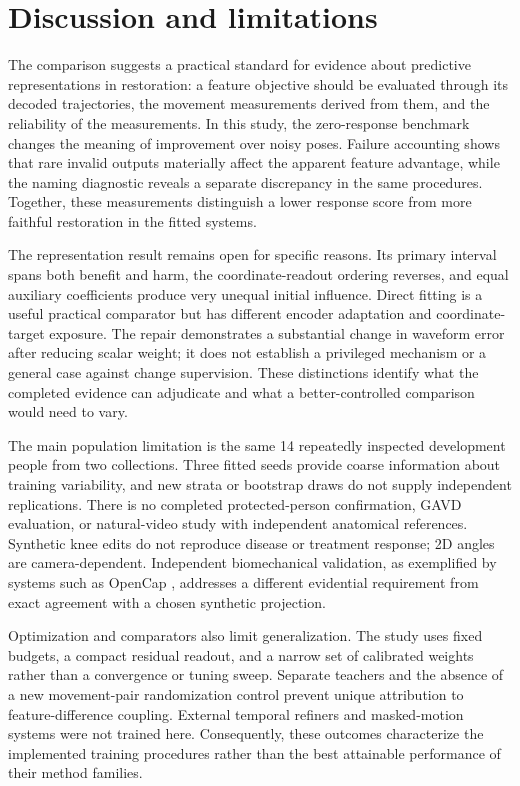 \documentclass{article}
\begin{document}
\section{Discussion and limitations}
The comparison suggests a practical standard for evidence about predictive representations in restoration: a feature objective should be evaluated through its decoded trajectories, the movement measurements derived from them, and the reliability of the measurements. In this study, the zero-response benchmark changes the meaning of improvement over noisy poses. Failure accounting shows that rare invalid outputs materially affect the apparent feature advantage, while the naming diagnostic reveals a separate discrepancy in the same procedures. Together, these measurements distinguish a lower response score from more faithful restoration in the fitted systems.

The representation result remains open for specific reasons. Its primary interval spans both benefit and harm, the coordinate-readout ordering reverses, and equal auxiliary coefficients produce very unequal initial influence. Direct fitting is a useful practical comparator but has different encoder adaptation and coordinate-target exposure. The repair demonstrates a substantial change in waveform error after reducing scalar weight; it does not establish a privileged mechanism or a general case against change supervision. These distinctions identify what the completed evidence can adjudicate and what a better-controlled comparison would need to vary.

The main population limitation is the same 14 repeatedly inspected development people from two collections. Three fitted seeds provide coarse information about training variability, and new strata or bootstrap draws do not supply independent replications. There is no completed protected-person confirmation, GAVD evaluation, or natural-video study with independent anatomical references. Synthetic knee edits do not reproduce disease or treatment response; 2D angles are camera-dependent. Independent biomechanical validation, as exemplified by systems such as OpenCap \citep{uhlrich2023opencap}, addresses a different evidential requirement from exact agreement with a chosen synthetic projection.

Optimization and comparators also limit generalization. The study uses fixed budgets, a compact residual readout, and a narrow set of calibrated weights rather than a convergence or tuning sweep. Separate teachers and the absence of a new movement-pair randomization control prevent unique attribution to feature-difference coupling. External temporal refiners and masked-motion systems were not trained here. Consequently, these outcomes characterize the implemented training procedures rather than the best attainable performance of their method families.
\end{document}
